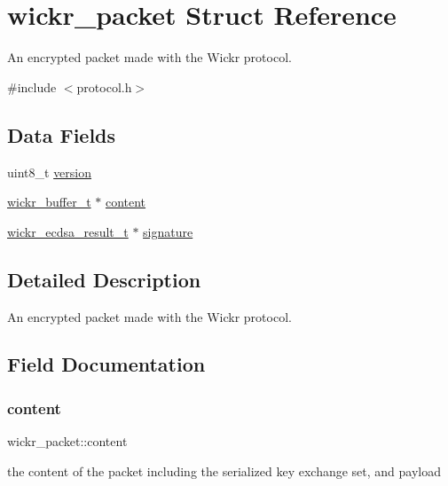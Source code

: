 \hypertarget{structwickr__packet}{}\section{wickr\+\_\+packet Struct Reference}
\label{structwickr__packet}


An encrypted packet made with the Wickr protocol.  




{\ttfamily \#include $<$protocol.\+h$>$}

\subsection*{Data Fields}
\begin{DoxyCompactItemize}
\item 
uint8\+\_\+t \mbox{\hyperlink{structwickr__packet_a35c17c926c267a603e810b88961c2bf3}{version}}
\item 
\mbox{\hyperlink{structwickr__buffer}{wickr\+\_\+buffer\+\_\+t}} $\ast$ \mbox{\hyperlink{structwickr__packet_a4d17d017c9d0fbb6e748a7ed935e5512}{content}}
\item 
\mbox{\hyperlink{structwickr__ecdsa__result}{wickr\+\_\+ecdsa\+\_\+result\+\_\+t}} $\ast$ \mbox{\hyperlink{structwickr__packet_a8b5e9a4eed6f133ffedd1aa9178b5567}{signature}}
\end{DoxyCompactItemize}


\subsection{Detailed Description}
An encrypted packet made with the Wickr protocol. 

\subsection{Field Documentation}
\mbox{\label{structwickr__packet_a4d17d017c9d0fbb6e748a7ed935e5512}} 
\subsubsection{\texorpdfstring{content}{content}}
{\footnotesize\ttfamily wickr\+\_\+packet\+::content}

the content of the packet including the serialized key exchange set, and payload \mbox{\label{structwickr__packet_a8b5e9a4eed6f133ffedd1aa9178b5567}} 
